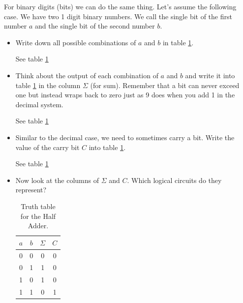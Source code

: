 \documentclass[10pt,a4paper]{article}
\begin{document}
	For binary digits (bits) we can do the same thing. Let's assume the following case. We have two 1 digit binary numbers. We call the single bit of the first number $a$ and the single bit of the second number $b$.
	\begin{itemize}
		\item Write down all possible combinations of $a$ and $b$ in table \ref{tab:half-adder-truth-table}.
		\begin{center}
			See table \ref{tab:half-adder-truth-table}
		\end{center}
		\item Think about the output of each combination of $a$ and $b$ and write it into table \ref{tab:half-adder-truth-table} in the column $\Sigma$ (for sum). Remember that a bit can never exceed one but instead wraps back to zero just as 9 does when you add 1 in the decimal system.
		\begin{center}
			See table \ref{tab:half-adder-truth-table}
		\end{center}
		\item Similar to the decimal case, we need to sometimes carry a bit. Write the value of the carry bit $C$ into table \ref{tab:half-adder-truth-table}.
		\begin{center}
			See table \ref{tab:half-adder-truth-table}
		\end{center}
		\item Now look at the columns of $\Sigma$ and $C$. Which logical circuits do they represent?
		
		\begin{table}[H]
			\centering
			\begin{tabular}{|c|c||c|c|}
				\hline
				$a$ & $b$ & $\Sigma$   & $C$ \\ \hline
				0&     0&0           &0       \\ \hline
				0&     1&1           &0       \\ \hline
				1&     0&1           &0       \\ \hline
				1&     1&0           &1       \\ \hline
			\end{tabular}
			\caption{Truth table for the Half Adder.}
			\label{tab:half-adder-truth-table}
		\end{table}
		

\end{itemize}
\end{document}
